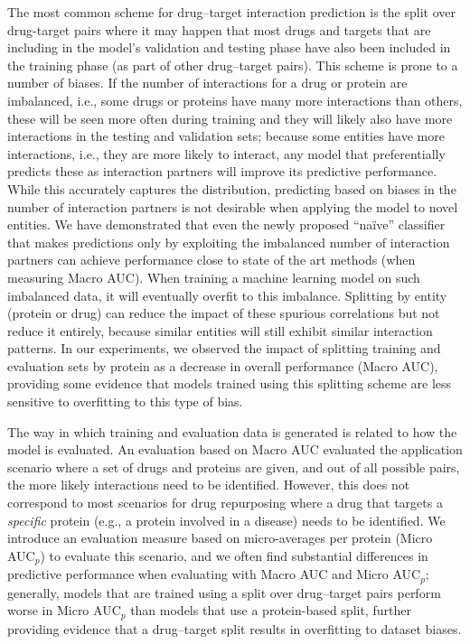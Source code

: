 \documentclass{bioinfo}
\renewcommand{\cite}{\citep}
\begin{document}
The most common scheme for drug--target interaction prediction is the
split over drug-target pairs \cite{Survey2018} where it may happen
that most drugs and targets that are including in the model's
validation and testing phase have also been included in the training
phase (as part of other drug--target pairs). This scheme is prone to a
number of biases. If the number of interactions for a drug or protein
are imbalanced, i.e., some drugs or proteins have many more
interactions than others, these will be seen more often during
training and they will likely also have more interactions in the
testing and validation sets; because some entities have more
interactions, i.e., they are more likely to interact, any model that
preferentially predicts these as interaction partners will improve its
predictive performance. While this accurately captures the
distribution, predicting based on biases in the number of interaction
partners is not desirable when applying the model to novel
entities. We have demonstrated that even the newly proposed
``na\"ive'' classifier that makes predictions only by exploiting the
imbalanced number of interaction partners can achieve performance
close to state of the art methods (when measuring Macro AUC). When
training a machine learning model on such imbalanced data, it will
eventually overfit to this imbalance.  Splitting by entity (protein or
drug) can reduce the impact of these spurious correlations but not
reduce it entirely, because similar entities will still exhibit
similar interaction patterns. In our experiments, we observed the
impact of splitting training and evaluation sets by protein as a
decrease in overall performance (Macro AUC), providing some evidence
that models trained using this splitting scheme are less sensitive to
overfitting to this type of bias.

The way in which training and evaluation data is generated is related
to how the model is evaluated. An evaluation based on Macro AUC
evaluated the application scenario where a set of drugs and proteins
are given, and out of all possible pairs, the more likely interactions
need to be identified. However, this does not correspond to most
scenarios for drug repurposing where a drug that targets a {\em
  specific} protein (e.g., a protein involved in a disease) needs to
be identified. We introduce an evaluation measure based on
micro-averages per protein (Micro AUC$_p$) to evaluate this scenario,
and we often find substantial differences in predictive performance
when evaluating with Macro AUC and Micro AUC$_p$; generally, models
that are trained using a split over drug--target pairs perform worse
in Micro AUC$_p$ than models that use a protein-based split, further
providing evidence that a drug--target split results in overfitting to
dataset biases.
\end{document}
